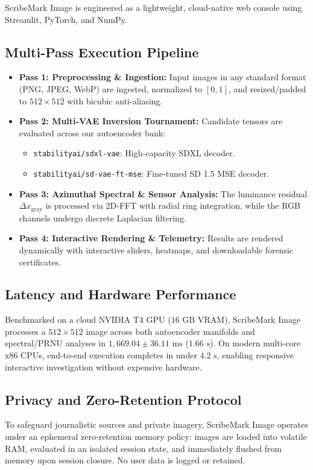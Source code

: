 \documentclass[letterpaper]{article}
\begin{document}
ScribeMark Image is engineered as a lightweight, cloud-native web console using Streamlit, PyTorch, and NumPy.

\subsection{Multi-Pass Execution Pipeline}
\begin{itemize}
    \item \textbf{Pass 1: Preprocessing \& Ingestion:} Input images in any standard format (PNG, JPEG, WebP) are ingested, normalized to $[0, 1]$, and resized/padded to $512 \times 512$ with bicubic anti-aliasing.
    \item \textbf{Pass 2: Multi-VAE Inversion Tournament:} Candidate tensors are evaluated across our autoencoder bank:
    \begin{itemize}
        \item \texttt{stabilityai/sdxl-vae}: High-capacity SDXL decoder.
        \item \texttt{stabilityai/sd-vae-ft-mse}: Fine-tuned SD 1.5 MSE decoder.
    \end{itemize}
    \item \textbf{Pass 3: Azimuthal Spectral \& Sensor Analysis:} The luminance residual $\Delta x_{\text{gray}}$ is processed via 2D-FFT with radial ring integration, while the RGB channels undergo discrete Laplacian filtering.
    \item \textbf{Pass 4: Interactive Rendering \& Telemetry:} Results are rendered dynamically with interactive sliders, heatmaps, and downloadable forensic certificates.
\end{itemize}

\subsection{Latency and Hardware Performance}
Benchmarked on a cloud NVIDIA T4 GPU ($16\text{ GB}$ VRAM), ScribeMark Image processes a $512 \times 512$ image across both autoencoder manifolds and spectral/PRNU analyses in $1,669.04 \pm 36.11\text{ ms}$ ($1.66\text{ s}$). On modern multi-core x86 CPUs, end-to-end execution completes in under $4.2\text{ s}$, enabling responsive interactive investigation without expensive hardware.

\subsection{Privacy and Zero-Retention Protocol}
To safeguard journalistic sources and private imagery, ScribeMark Image operates under an ephemeral zero-retention memory policy: images are loaded into volatile RAM, evaluated in an isolated session state, and immediately flushed from memory upon session closure. No user data is logged or retained.
\end{document}
